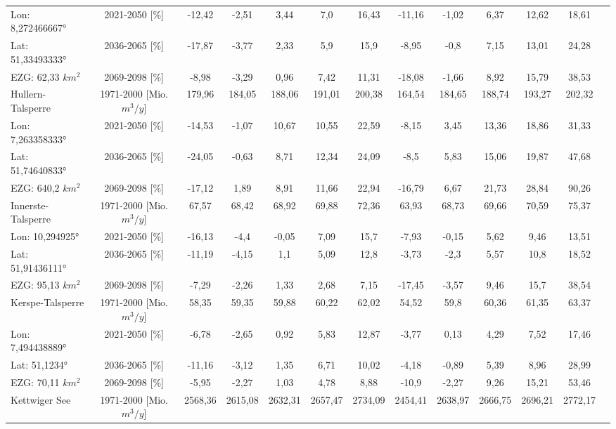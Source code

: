 \begin{longtable}{@{\extracolsep{\fill}}lc|ccccc||cccccc}
\cline{2-13} 
Lon: 8,272466667° & 2021-2050 [\%]  & -12,42 & -2,51 & 3,44 & 7,0 & 16,43 & -11,16 & -1,02 & 6,37 & 12,62 & 18,61 & \\ 
Lat: 51,33493333° & 2036-2065 [\%]  & -17,87 & -3,77 & 2,33 & 5,9 & 15,9 & -8,95 & -0,8 & 7,15 & 13,01 & 24,28 & \\ 
EZG: 62,33 $km^2$ & 2069-2098 [\%]  & -8,98 & -3,29 & 0,96 & 7,42 & 11,31 & -18,08 & -1,66 & 8,92 & 15,79 & 38,53 & \\ 
\hline 
Hullern-Talsperre & 1971-2000 [Mio. $m^3/y$]  & 179,96 & 184,05 & 188,06 & 191,01 & 200,38 & 164,54 & 184,65 & 188,74 & 193,27 & 202,32 & \\ 
\cline{2-13} 
Lon: 7,263358333° & 2021-2050 [\%]  & -14,53 & -1,07 & 10,67 & 10,55 & 22,59 & -8,15 & 3,45 & 13,36 & 18,86 & 31,33 & \\ 
Lat: 51,74640833° & 2036-2065 [\%]  & -24,05 & -0,63 & 8,71 & 12,34 & 24,09 & -8,5 & 5,83 & 15,06 & 19,87 & 47,68 & \\ 
EZG: 640,2 $km^2$ & 2069-2098 [\%]  & -17,12 & 1,89 & 8,91 & 11,66 & 22,94 & -16,79 & 6,67 & 21,73 & 28,84 & 90,26 & \\ 
\hline 
Innerste-Talsperre & 1971-2000 [Mio. $m^3/y$]  & 67,57 & 68,42 & 68,92 & 69,88 & 72,36 & 63,93 & 68,73 & 69,66 & 70,59 & 75,37 & \\ 
\cline{2-13} 
Lon: 10,294925° & 2021-2050 [\%]  & -16,13 & -4,4 & -0,05 & 7,09 & 15,7 & -7,93 & -0,15 & 5,62 & 9,46 & 13,51 & \\ 
Lat: 51,91436111° & 2036-2065 [\%]  & -11,19 & -4,15 & 1,1 & 5,09 & 12,8 & -3,73 & -2,3 & 5,57 & 10,8 & 18,52 & \\ 
EZG: 95,13 $km^2$ & 2069-2098 [\%]  & -7,29 & -2,26 & 1,33 & 2,68 & 7,15 & -17,45 & -3,57 & 9,46 & 15,7 & 38,54 & \\ 
\hline 
Kerspe-Talsperre & 1971-2000 [Mio. $m^3/y$]  & 58,35 & 59,35 & 59,88 & 60,22 & 62,02 & 54,52 & 59,8 & 60,36 & 61,35 & 63,37 & \\ 
\cline{2-13} 
Lon: 7,494438889° & 2021-2050 [\%]  & -6,78 & -2,65 & 0,92 & 5,83 & 12,87 & -3,77 & 0,13 & 4,29 & 7,52 & 17,46 & \\ 
Lat: 51,1234° & 2036-2065 [\%]  & -11,16 & -3,12 & 1,35 & 6,71 & 10,02 & -4,18 & -0,89 & 5,39 & 8,96 & 28,99 & \\ 
EZG: 70,11 $km^2$ & 2069-2098 [\%]  & -5,95 & -2,27 & 1,03 & 4,78 & 8,88 & -10,9 & -2,27 & 9,26 & 15,21 & 53,46 & \\ 
\hline 
Kettwiger See & 1971-2000 [Mio. $m^3/y$]  & 2568,36 & 2615,08 & 2632,31 & 2657,47 & 2734,09 & 2454,41 & 2638,97 & 2666,75 & 2696,21 & 2772,17 & \\ 

\end{longtable}
